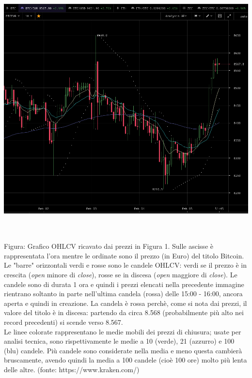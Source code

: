 \documentclass[a4paper,12pt]{report}
\begin{document}
\begin{fig}
\begin{center}
		\includegraphics[width=\linewidth]{kraken_ohlcv}
\end{center}
		\caption{\\~\\Figura: Grafico OHLCV ricavato dai prezzi in Figura 1. Sulle ascisse è rappresentata l'ora mentre le ordinate sono il prezzo (in Euro) del titolo Bitcoin. Le "barre" orizzontali verdi e rosse sono le candele OHLCV: verdi se il prezzo è in crescita (\textit{open} minore di \textit{close}), rosse se in discesa (\textit{open} maggiore di \textit{close}). Le candele sono di durata 1 ora e quindi i prezzi elencati nella precedente immagine rientrano soltanto in parte nell'ultima candela (rossa) delle 15:00 - 16:00, ancora aperta e quindi in creazione. La candela è rossa perchè, come si nota dai prezzi, il valore del titolo  è in discesa: partendo da circa 8.568 (probabilmente più alto nei record precedenti) si scende verso 8.567.\\
			Le linee colorate rappresentano le medie mobili dei prezzi di chiusura; usate per analisi tecnica, sono rispettivamente le medie a 10 (verde), 21 (azzurro) e 100 (blu) candele. Più candele sono considerate nella media e meno questa cambierà bruscamente, avendo quindi la media a 100 candele (cioè 100 ore) molto più lenta delle altre. (fonte: https://www.kraken.com/)}
\end{fig}
\end{document}
